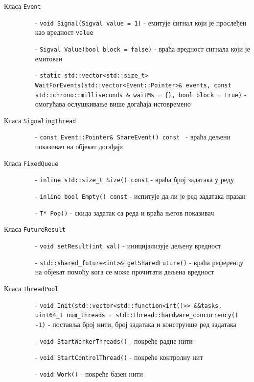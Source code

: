 \documentclass[12pt,oneside]{memoir}
\begin{document}
\begin{description}
	\item[Класа \texttt{Event}]\leavevmode
		\begin{itemize}
			\item[-] \texttt{void Signal(Sigval value = 1)} - емитује сигнал који је прослеђен као вредност \texttt{value}
			\item[-] \texttt{Sigval Value(bool block = false)} - враћа вредност сигнала који је емитован  
			\item[-] \texttt{static std::vector<std::size\_t> WaitForEvents(std::vector<Event::Pointer>\& events, const std::chrono::milliseconds \& waitMs = \{\}, bool block = true)} - омогућава ослушкивање више догаћаја истовремено
		\end{itemize}			
	\item[Класа \texttt{SignalingThread}]\leavevmode
		\begin{itemize}
			\item[-] \texttt{const Event::Pointer\& ShareEvent() const } - враћа дељени показивач на објекат догађаја 	
		\end{itemize}			
	\item[Класа \texttt{FixedQueue}]\leavevmode
		\begin{itemize}
			\item[-] \texttt{inline std::size\_t Size() const} - враћа број задатака у реду
			\item[-] \texttt{inline bool Empty() const} - испитује да ли је ред задатака 	празан	
			\item[-] \texttt{T* Pop()} - скида задатак са реда и враћа његов показивач
		\end{itemize}			
	\item[Класа \texttt{FutureResult}]\leavevmode
		\begin{itemize}
			\item[-] \texttt{void setResult(int val)} - иницијализује дељену вредност
			\item[-] \texttt{std::shared\_future<int>\& getSharedFuture()} - враћа референцу на објекат помоћу кога се може прочитати дељена вредност			
		\end{itemize}			
	\item[Класа \texttt{ThreadPool}]\leavevmode
		\begin{itemize}
			\item[-] \texttt{void Init(std::vector<std::function<int()>> \&\&tasks, uint64\_t num\_threads = std::thread::hardware\_concurrency() -1)} - поставља број нити, број задатака и конструише ред задатака	
			\item[-]\texttt{void StartWorkerThreads()} - покреће радне нити 			 		\item[-] \texttt{void StartControlThread()} - покреће контролну нит
			\item[-] \texttt{void Work()} - покреће базен нити
		\end{itemize}			
\end{description}
\end{document}
